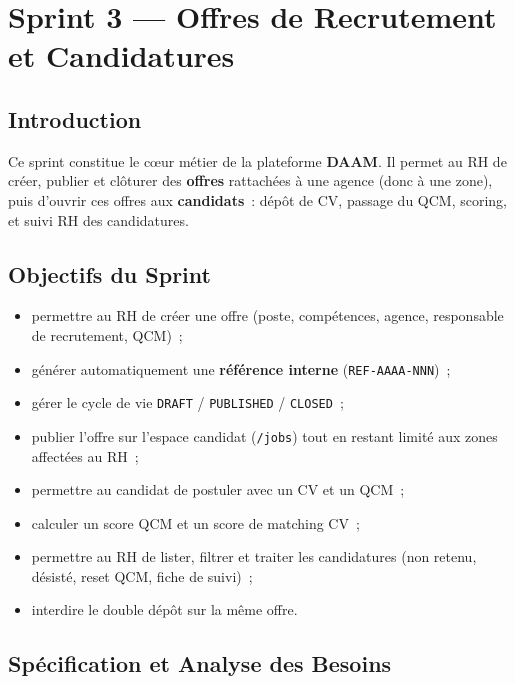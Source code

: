 \chapter{Sprint 3 --- Offres de Recrutement et Candidatures}

\section{Introduction}

Ce sprint constitue le cœur métier de la plateforme \textbf{DAAM}.
Il permet au RH de créer, publier et clôturer des \textbf{offres}
rattachées à une agence (donc à une zone), puis d'ouvrir ces offres aux
\textbf{candidats}~: dépôt de CV, passage du QCM, scoring, et suivi RH
des candidatures.

\section{Objectifs du Sprint}



\begin{itemize}
  \item permettre au RH de créer une offre (poste, compétences, agence,
        responsable de recrutement, QCM)~;
  \item générer automatiquement une \textbf{référence interne}
        (\texttt{REF-AAAA-NNN})~;
  \item gérer le cycle de vie \texttt{DRAFT} / \texttt{PUBLISHED} /
        \texttt{CLOSED}~;
  \item publier l'offre sur l'espace candidat (\texttt{/jobs}) tout en
        restant limité aux zones affectées au RH~;
  \item permettre au candidat de postuler avec un CV et un QCM~;
  \item calculer un score QCM et un score de matching CV~;
  \item permettre au RH de lister, filtrer et traiter les candidatures
        (non retenu, désisté, reset QCM, fiche de suivi)~;
  \item interdire le double dépôt sur la même offre.
\end{itemize}


\section{Spécification et Analyse des Besoins}

